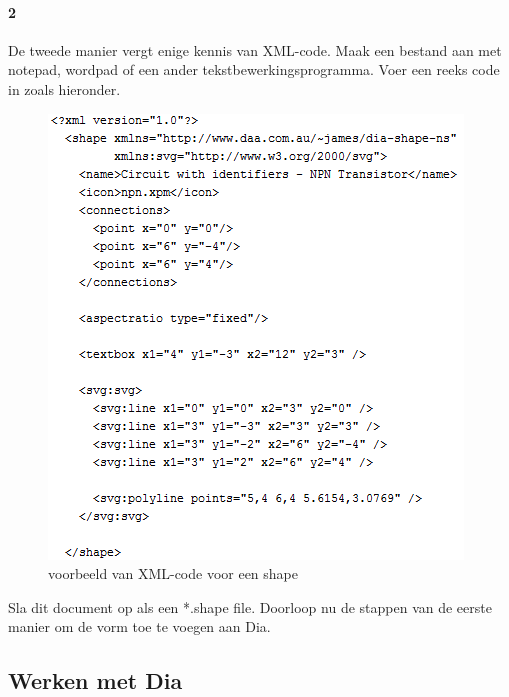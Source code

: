 \documentclass[12pt,a4paper]{report}
\begin{document}
\begin{flushleft}
\paragraph*{2}
De tweede manier vergt enige kennis van XML-code. 
Maak een bestand aan met notepad, wordpad of een ander tekstbewerkingsprogramma.
Voer een reeks code in zoals hieronder.
\begin{figure}[H]
\includegraphics[scale=1]{images/shape_04.png}
\centering 
\vspace{-10pt}
\caption{voorbeeld van XML-code voor een shape}
\end{figure}
Sla dit document op als een *.shape file. Doorloop nu de stappen van de eerste manier om de vorm toe te voegen aan Dia.
\pagebreak
\subsection{Werken met Dia}

\end{flushleft}
\end{document}
